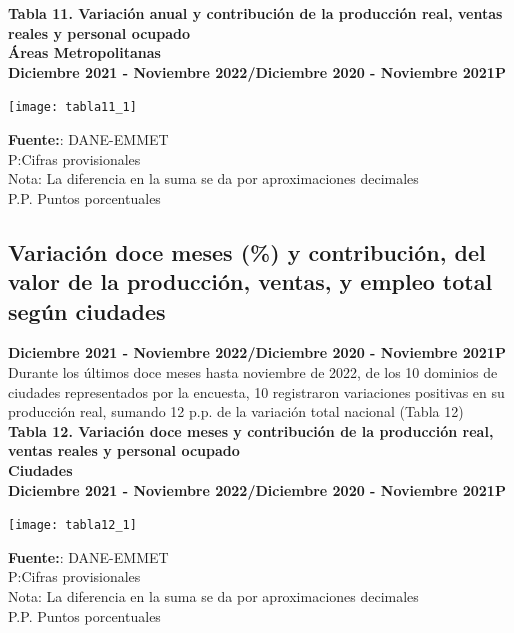 \documentclass[
]{article}
\begin{document}
\textbf{Tabla 11. Variación anual y contribución de la producción real,
ventas reales y personal ocupado}\\
\textbf{Áreas Metropolitanas}\\
\textbf{Diciembre 2021 - Noviembre 2022/Diciembre 2020 - Noviembre
2021P}\\

\begin{center}\texttt{[image: tabla11\_1]} \end{center}

\textbf{Fuente:}: DANE-EMMET\\
P:Cifras provisionales\\
Nota: La diferencia en la suma se da por aproximaciones decimales\\
P.P. Puntos porcentuales\\

\newpage

\hypertarget{variaciuxf3n-doce-meses-y-contribuciuxf3n-del-valor-de-la-producciuxf3n-ventas-y-empleo-total-seguxfan-ciudades}{%
\subsection{Variación doce meses (\%) y contribución, del valor de la
producción, ventas, y empleo total según
ciudades}\label{variaciuxf3n-doce-meses-y-contribuciuxf3n-del-valor-de-la-producciuxf3n-ventas-y-empleo-total-seguxfan-ciudades}}

\textbf{Diciembre 2021 - Noviembre 2022/Diciembre 2020 - Noviembre
2021P}\\

Durante los últimos doce meses hasta noviembre de 2022, de los 10
dominios de ciudades representados por la encuesta, 10 registraron
variaciones positivas en su producción real, sumando 12 p.p. de la
variación total nacional (Tabla 12)\\

\textbf{Tabla 12. Variación doce meses y contribución de la producción
real, ventas reales y personal ocupado}\\
\textbf{Ciudades}\\
\textbf{Diciembre 2021 - Noviembre 2022/Diciembre 2020 - Noviembre
2021P}\\

\begin{center}\texttt{[image: tabla12\_1]} \end{center}

\textbf{Fuente:}: DANE-EMMET\\
P:Cifras provisionales\\
Nota: La diferencia en la suma se da por aproximaciones decimales\\
P.P. Puntos porcentuales\\
\end{document}
